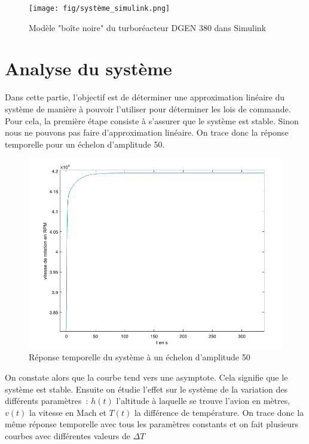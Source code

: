 \documentclass[12pt]{report}
\begin{document}
\begin{figure}[!h]
  \vspace{1cm}
  \centering
  \texttt{[image: fig/système\_simulink.png]}
  \caption{Modèle "boîte noire" du turboréacteur DGEN 380 dans Simulink}
  \vspace{0.5cm}
\end{figure}

\newpage

\section{Analyse du système}
Dans cette partie, l’objectif est de déterminer une approximation linéaire du 
système de manière à pouvoir l’utiliser pour déterminer les lois de commande.  
Pour cela, la première étape consiste à s’assurer que le système est stable. 
Sinon nous ne pouvons pas faire d’approximation linéaire.
On trace donc la réponse temporelle pour un échelon d’amplitude 50.

\begin{figure}[!h]
  \vspace{1cm}
  \centering
  \includegraphics[scale=0.35]{fig/step_response.png}
  \caption{Réponse temporelle du système à un échelon d'amplitude 50}
  \vspace{0.5cm}
\end{figure}

On constate alors que la courbe tend vers une asymptote. Cela signifie que le
système est stable.
Ensuite on étudie l’effet sur le système de la variation des différents
paramètres : $h(t)$ l’altitude à laquelle se trouve l’avion en mètres, $v(t)$ la 
vitesse en Mach et $T(t)$ la différence de température. On trace donc la même 
réponse temporelle avec tous les paramètres constants et on fait plusieurs courbes 
avec différentes valeurs de $\Delta T$
\end{document}
